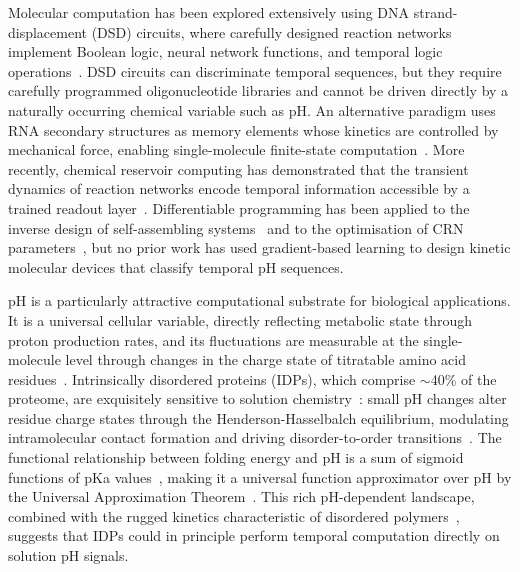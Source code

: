 \documentclass[10pt,twocolumn]{article}
\begin{document}
Molecular computation has been explored extensively using DNA strand-displacement (DSD) circuits, where carefully designed reaction networks implement Boolean logic, neural network functions, and temporal logic operations~\cite{qian2011,lapteva2022}.
DSD circuits can discriminate temporal sequences, but they require carefully programmed oligonucleotide libraries and cannot be driven directly by a naturally occurring chemical variable such as pH.
An alternative paradigm uses RNA secondary structures as memory elements whose kinetics are controlled by mechanical force, enabling single-molecule finite-state computation~\cite{zhang2025}.
More recently, chemical reservoir computing has demonstrated that the transient dynamics of reaction networks encode temporal information accessible by a trained readout layer~\cite{dack2024}.
Differentiable programming has been applied to the inverse design of self-assembling systems~\cite{goodrich2021} and to the optimisation of CRN parameters~\cite{buisman2023}, but no prior work has used gradient-based learning to design kinetic molecular devices that classify temporal pH sequences.

pH is a particularly attractive computational substrate for biological applications.
It is a universal cellular variable, directly reflecting metabolic state through proton production rates, and its fluctuations are measurable at the single-molecule level through changes in the charge state of titratable amino acid residues~\cite{losdorfer2017}.
Intrinsically disordered proteins (IDPs), which comprise $\sim$40\% of the proteome, are exquisitely sensitive to solution chemistry~\cite{moses2020,moses2023}: small pH changes alter residue charge states through the Henderson-Hasselbalch equilibrium, modulating intramolecular contact formation and driving disorder-to-order transitions~\cite{moritsugu2012}.
The functional relationship between folding energy and pH is a sum of sigmoid functions of pKa values~\cite{losdorfer2017}, making it a universal function approximator over pH by the Universal Approximation Theorem~\cite{pinkus1999}.
This rich pH-dependent landscape, combined with the rugged kinetics characteristic of disordered polymers~\cite{bryngelson1987,beauchamp2012}, suggests that IDPs could in principle perform temporal computation directly on solution pH signals.
\end{document}
